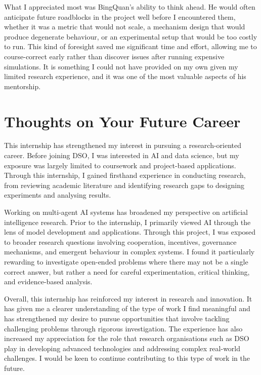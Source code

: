 \documentclass[12pt,a4paper]{article}
\begin{document}
What I appreciated most was BingQuan's ability to think ahead. He would often anticipate future roadblocks in the project well before I encountered them, whether it was a metric that would not scale, a mechanism design that would produce degenerate behaviour, or an experimental setup that would be too costly to run. This kind of foresight saved me significant time and effort, allowing me to course-correct early rather than discover issues after running expensive simulations. It is something I could not have provided on my own given my limited research experience, and it was one of the most valuable aspects of his mentorship.



\section{Thoughts on Your Future Career}

This internship has strengthened my interest in pursuing a research-oriented career. Before joining DSO, I was interested in AI and data science, but my exposure was largely limited to coursework and project-based applications. Through this internship, I gained firsthand experience in conducting research, from reviewing academic literature and identifying research gaps to designing experiments and analysing results.

Working on multi-agent AI systems has broadened my perspective on artificial intelligence research. Prior to the internship, I primarily viewed AI through the lens of model development and applications. Through this project, I was exposed to broader research questions involving cooperation, incentives, governance mechanisms, and emergent behaviour in complex systems. I found it particularly rewarding to investigate open-ended problems where there may not be a single correct answer, but rather a need for careful experimentation, critical thinking, and evidence-based analysis.

Overall, this internship has reinforced my interest in research and innovation. It has given me a clearer understanding of the type of work I find meaningful and has strengthened my desire to pursue opportunities that involve tackling challenging problems through rigorous investigation. The experience has also increased my appreciation for the role that research organisations such as DSO play in developing advanced technologies and addressing complex real-world challenges. I would be keen to continue contributing to this type of work in the future.
\end{document}
